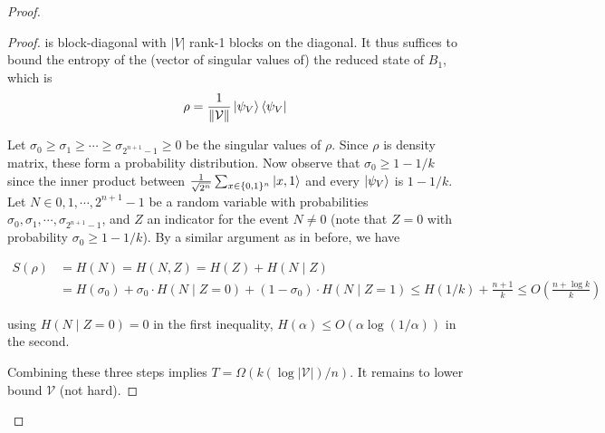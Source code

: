 \documentclass[main.tex]{subfiles}
\begin{document}
\begin{proof}
\begin{proof}
is block-diagonal with $|V|$ rank-1 blocks on the diagonal. It thus suffices to bound the entropy
of the (vector of singular values of) the reduced state of $B_1$, which is 
$$
\rho = \frac{1}{\|\mathcal{V}\|}\ket{\psi_V}\bra{\psi_V}
$$
 
Let $\sigma_0 \geq \sigma_1 \geq \cdots \geq \sigma_{2^{n+1}-1}\geq 0$ be the singular values of $\rho$. Since $\rho$ is density matrix, these form a probability distribution. Now observe that $\sigma_0 \geq 1 - 1/k$ since the inner product between $\frac{1}{\sqrt{2^n}} \sum_{x \in \{0, 1\}^n} \ket{x,1}$ and every $\ket{\psi_V}$ is $1 - 1/k$. Let $N \in {0,1,\cdots ,2^{n+1} − 1}$ be a random variable with probabilities $\sigma_0, \sigma_1, \cdots, \sigma_{2^{n+1}-1}$, and $Z$ an indicator for the event $N \neq 0$ (note that $Z = 0$ with probability $\sigma_0 \geq 1 - 1/k$). By a similar argument as in before, we have 

\begin{align*}
S (\rho) &= H (N) = H (N, Z) = H (Z) + H (N \mid Z)\\
&= H(\sigma_0)+\sigma_0\cdot H(N \mid Z=0)+(1- \sigma_0)\cdot H(N\mid Z=1)\leq H (1/k) + \frac{n+1}{k} \leq O(\frac{n + \log k}{k}) 
\end{align*}

using $H(N \mid Z = 0) = 0$ in the first inequality, $H(\alpha) \leq O(\alpha \log(1/\alpha))$ in the second.

Combining these three steps implies $T = \Omega(k(\log|\mathcal{V}|)/n)$. It remains to lower bound $\mathcal{V}$ (not hard).

\end{proof}

\end{proof}
%
%
%
%	
%
%
%
\end{document}
